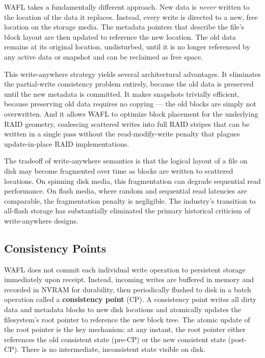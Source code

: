 WAFL takes a fundamentally different approach. New data is \emph{never} written to the location of the data it replaces. Instead, every write is directed to a new, free location on the storage media. The metadata pointers that describe the file's block layout are then updated to reference the new location. The old data remains at its original location, undisturbed, until it is no longer referenced by any active data or snapshot and can be reclaimed as free space.

This write-anywhere strategy yields several architectural advantages. It eliminates the partial-write consistency problem entirely, because the old data is preserved until the new metadata is committed. It makes snapshots trivially efficient, because preserving old data requires no copying --- the old blocks are simply not overwritten. And it allows WAFL to optimize block placement for the underlying RAID geometry, coalescing scattered writes into full RAID stripes that can be written in a single pass without the read-modify-write penalty that plagues update-in-place RAID implementations.

The tradeoff of write-anywhere semantics is that the logical layout of a file on disk may become fragmented over time as blocks are written to scattered locations. On spinning disk media, this fragmentation can degrade sequential read performance. On flash media, where random and sequential read latencies are comparable, the fragmentation penalty is negligible. The industry's transition to all-flash storage has substantially eliminated the primary historical criticism of write-anywhere designs.

\subsection{Consistency Points}

WAFL does not commit each individual write operation to persistent storage immediately upon receipt. Instead, incoming writes are buffered in memory and recorded in NVRAM for durability, then periodically flushed to disk in a batch operation called a \textbf{consistency point} (CP). A consistency point writes all dirty data and metadata blocks to new disk locations and atomically updates the filesystem's root pointer to reference the new block tree. The atomic update of the root pointer is the key mechanism: at any instant, the root pointer either references the old consistent state (pre-CP) or the new consistent state (post-CP). There is no intermediate, inconsistent state visible on disk.

